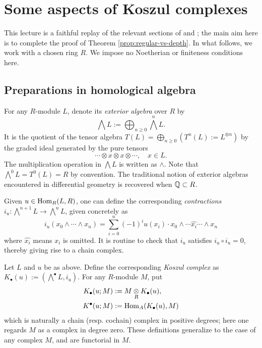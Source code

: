 
\chapter{Some aspects of Koszul complexes}

This lecture is a faithful replay of the relevant sections of \cite{Bour80} and \cite{Bour98}; the main aim here is to complete the proof of Theorem \ref{prop:regular-vs-depth}. In what follows, we work with a chosen ring $R$. We impose no Noetherian or finiteness conditions here.

\section{Preparations in homological algebra}
For any $R$-module $L$, denote its \emph{exterior algebra} over $R$ by
\[ \bigwedge L := \bigoplus_{n \geq 0} \bigwedge^n L. \]
It is the quotient of the tensor algebra $T(L) = \bigoplus_{n \geq 0} (T^n(L) := L^{\otimes n})$ by the graded ideal generated by the pure tensors
\[ \cdots \otimes x \otimes x \otimes \cdots, \quad x \in L. \]
The multiplication operation in $\bigwedge L$ is written as $\wedge$. Note that $\bigwedge^0 L = T^0(L) = R$ by convention. The traditional notion of exterior algebras encountered in differential geometry is recovered when $\mathbb{Q} \subset R$.

Given $u \in \operatorname{Hom}_R(L, R)$, one can define the corresponding \emph{contractions} $i_u: \bigwedge^{n+1} L \to \bigwedge^n L$, given concretely as
\[ i_u (x_0 \wedge \cdots \wedge x_n) = \sum_{i=0}^n (-1)^i u(x_i) \cdot x_0 \wedge \cdots \widehat{x_i} \cdots \wedge x_n \]
where $\widehat{x_i}$ means $x_i$ is omitted. It is routine to check that $i_u$ satisfies $i_u \circ i_u = 0$, thereby giving rise to a chain complex.

\begin{definition}\label{def:Koszul-general}
	Let $L$ and $u$ be as above. Define the corresponding \emph{Koszul complex} as $K_\bullet(u) := (\bigwedge^\bullet L, i_u)$. For any $R$-module $M$, put
	\begin{align*}
		K_\bullet(u; M) & := M \underset{R}{\otimes} K_\bullet(u), \\
		K^\bullet(u; M) & := \operatorname{Hom}_A(K_\bullet(u), M)
	\end{align*}
	which is naturally a chain (resp. cochain) complex in positive degrees; here one regards $M$ as a complex in degree zero. These definitions generalize to the case of any complex $M$, and are functorial in $M$.
\end{definition}

